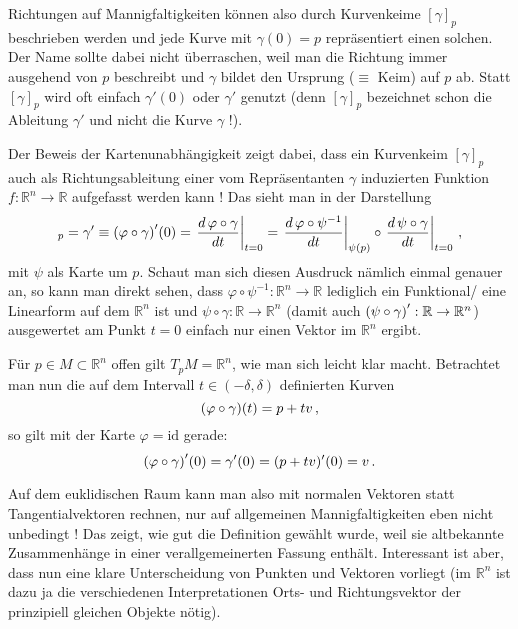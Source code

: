 \documentclass[../H_Analysis_main.tex]{subfiles}
\begin{document}

Richtungen auf Mannigfaltigkeiten können also durch Kurvenkeime $[\gamma]_p$ beschrieben werden und jede Kurve mit $\gamma(0) = p$ repräsentiert einen solchen. Der Name sollte dabei nicht überraschen, weil man die Richtung immer ausgehend von $p$ beschreibt und $\gamma$ bildet den Ursprung ($\equiv$ Keim) auf $p$ ab. Statt $[\gamma]_p$ wird oft einfach $\gamma'(0)$ oder $\gamma'$ genutzt (denn $[\gamma]_p$ bezeichnet schon die Ableitung $\gamma'$ und nicht die Kurve $\gamma$ !).

Der Beweis der Kartenunabhängigkeit zeigt dabei, dass ein Kurvenkeim $[\gamma]_p$ auch als Richtungsableitung einer vom Repräsentanten $\gamma$ induzierten Funktion $f: \mathbb{R}^n \rightarrow \mathbb{R}$ aufgefasst werden kann ! Das sieht man in der Darstellung
\begin{equation}
[\gamma]_p = \gamma' \equiv \qty(\varphi \circ \gamma)'(0) = \eval{\dv{\, \varphi \circ \gamma}{t}}_{t = 0} = \eval{\dv{\, \varphi \circ \psi^{-1}}{t}}_{\psi(p)} \circ \eval{\dv{\, \psi \circ \gamma}{t}}_{t = 0} \, ,
\end{equation}
mit $\psi$ als Karte um $p$. Schaut man sich diesen Ausdruck nämlich einmal genauer an, so kann man direkt sehen, dass $\varphi \circ \psi^{-1}: \mathbb{R}^n \rightarrow \mathbb{R}$ lediglich ein Funktional/ eine Linearform auf dem $\mathbb{R}^n$ ist und $\psi \circ \gamma: \mathbb{R} \rightarrow \mathbb{R}^n$ (damit auch $\qty(\psi \circ \gamma)': \mathbb{R} \rightarrow \mathbb{R}^n$) ausgewertet am Punkt $t = 0$ einfach nur einen Vektor im $\mathbb{R}^n$ ergibt.%


\begin{bsp}
Für $p \in M \subset \mathbb{R}^n$ offen gilt $T_p M = \mathbb{R}^n$, wie man sich leicht klar macht. Betrachtet man nun die auf dem Intervall $t \in (-\delta, \delta)$ definierten Kurven
\begin{equation}
\qty(\varphi \circ \gamma)(t) = p + t v \, ,
\end{equation}
so gilt mit der Karte $\varphi = \text{id}$ gerade:
\begin{equation}
\qty(\varphi \circ \gamma)'(0) = \gamma'(0) = (p + t v)'(0) = v \, .
\end{equation}
\end{bsp}
Auf dem euklidischen Raum kann man also mit normalen Vektoren statt Tangentialvektoren rechnen, nur auf allgemeinen Mannigfaltigkeiten eben nicht unbedingt ! Das zeigt, wie gut die Definition gewählt wurde, weil sie altbekannte Zusammenhänge in einer verallgemeinerten Fassung enthält. Interessant ist aber, dass nun eine klare Unterscheidung von Punkten und Vektoren vorliegt (im $\mathbb{R}^n$ ist dazu ja die verschiedenen Interpretationen Orts- und Richtungsvektor der prinzipiell gleichen Objekte nötig).
\end{document}
